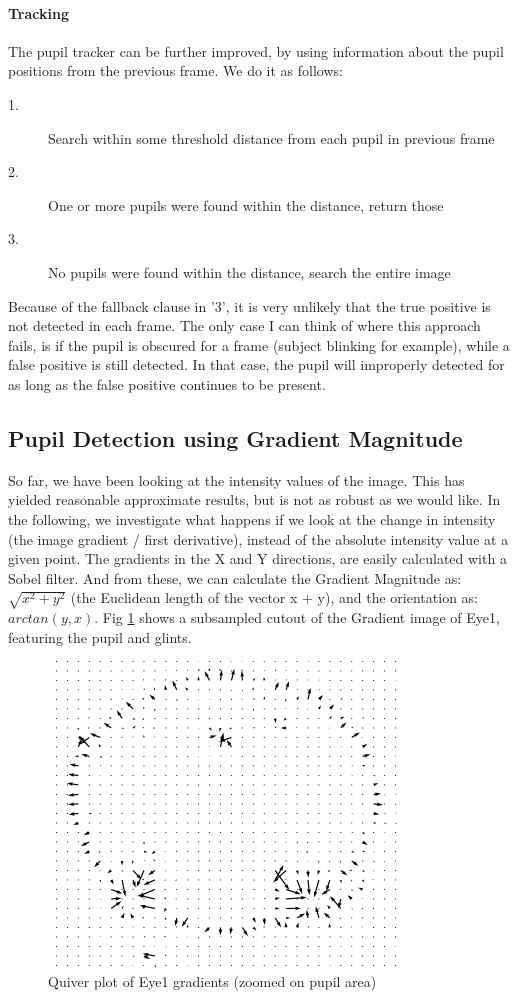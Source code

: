 \documentclass[a4paper,11pt]{article}
\begin{document}
\paragraph{Tracking} The pupil tracker can be further improved, by using information about the pupil positions from the previous frame. We do it as follows:
\begin{description}
\item[1.]{Search within some threshold distance from each pupil in previous frame}
\item[2.]{One or more pupils were found within the distance, return those}
\item[3.]{No pupils were found within the distance, search the entire image}
\end{description}
Because of the fallback clause in '3', it is very unlikely that the true positive is not detected in each frame. The only case I can think of where this approach fails, is if the pupil is obscured for a frame (subject blinking for example), while a false positive is still detected. In that case, the pupil will improperly detected for as long as the false positive continues to be present.

\subsection{Pupil Detection using Gradient Magnitude}
So far, we have been looking at the intensity values of the image. This has yielded reasonable approximate results, but is not as robust as we would like. In the following, we investigate what happens if we look at the change in intensity (the image gradient / first derivative), instead of the absolute intensity value at a given point.
The gradients in the X and Y directions, are easily calculated with a Sobel filter. And from these, we can calculate the Gradient Magnitude as: $\sqrt{x^2 + y^2}$ (the Euclidean length of the vector x + y), and the orientation as: $arctan(y, x)$. Fig \ref{fig:quiver} shows a subsampled cutout of the Gradient image of Eye1, featuring the pupil and glints.

\begin{figure}[ht]
  \centering
  \includegraphics[scale=0.5]{quiver_cutout}
  \caption{Quiver plot of Eye1 gradients (zoomed on pupil area)}
  \label{fig:quiver}
\end{figure}
\end{document}
